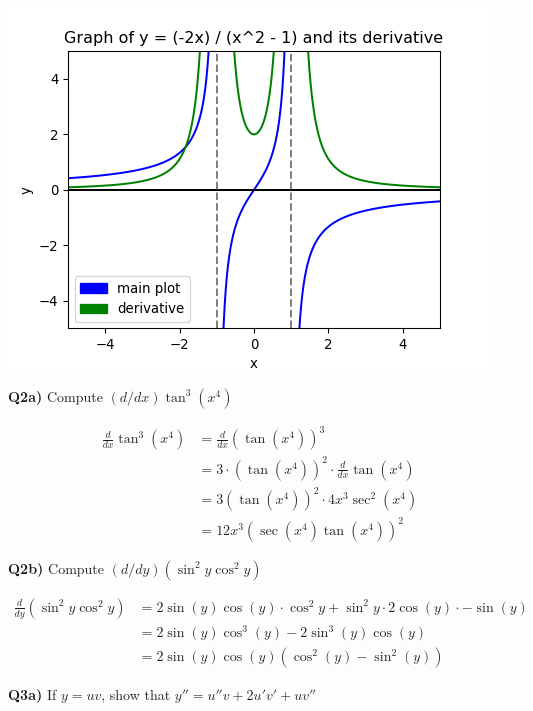 \documentclass[9pt]{article}
\begin{document}
\begin{center}
  \includegraphics[scale=0.8]{q1_odd.png}
\end{center}


\begin{tcolorbox}
  \textbf{Q2a)} Compute $(d/dx) \tan^3(x^4)$
\end{tcolorbox}

\begin{align*}
  \frac{d}{dx} \tan^3 (x^4) &= \frac{d}{dx} (\tan(x^4))^3\\
                           &= 3 \cdot (\tan(x^4))^2 \cdot \frac{d}{dx} \tan(x^4)\\
                           &= 3(\tan(x^4))^2 \cdot 4x^3 \sec^2(x^4)\\
                           &= 12x^3 (\sec(x^4)\tan(x^4))^2
\end{align*}


\begin{tcolorbox}
  \textbf{Q2b)} Compute $(d/dy)(\sin^2y\cos^2y)$
\end{tcolorbox}

\begin{align*}
  \frac{d}{dy} (\sin^2y\cos^2y) &= 2\sin(y)\cos(y) \cdot \cos^2y + \sin^2y \cdot 2\cos(y) \cdot -\sin(y)\\
                                &= 2\sin(y)\cos^3(y) - 2\sin^3(y)\cos(y)\\
                                &= 2\sin(y)\cos(y)(\cos^2(y) - \sin^2(y))
\end{align*}


\begin{tcolorbox}
  \textbf{Q3a)} If $y = uv$, show that $y'' = u''v + 2u'v' + uv''$
\end{tcolorbox}
\end{document}
